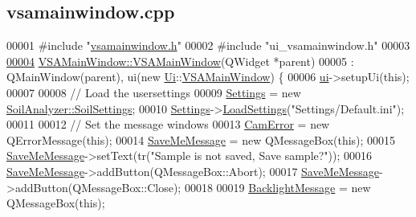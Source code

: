 \hypertarget{vsamainwindow_8cpp_source}{}\subsection{vsamainwindow.\+cpp}
\label{vsamainwindow_8cpp_source}

\begin{DoxyCode}
00001 \textcolor{preprocessor}{#include "\hyperlink{vsamainwindow_8h}{vsamainwindow.h}"}
00002 \textcolor{preprocessor}{#include "ui\_vsamainwindow.h"}
00003 
\hypertarget{vsamainwindow_8cpp_source_l00004}{}\hyperlink{class_v_s_a_main_window_a7fa18757c1fce5c8f41f25277f9e1a70}{00004} \hyperlink{class_v_s_a_main_window_a7fa18757c1fce5c8f41f25277f9e1a70}{VSAMainWindow::VSAMainWindow}(QWidget *parent)
00005     : QMainWindow(parent), ui(new \hyperlink{namespace_ui}{Ui}::\hyperlink{class_v_s_a_main_window}{VSAMainWindow}) \{
00006   \hyperlink{class_v_s_a_main_window_a958a0581d2bf1bfe020c3b5d8f738640}{ui}->setupUi(\textcolor{keyword}{this});
00007 
00008   \textcolor{comment}{// Load the usersettings}
00009   \hyperlink{class_v_s_a_main_window_a429310b9a60f66c4283dc609f869b48d}{Settings} = \textcolor{keyword}{new} \hyperlink{class_soil_analyzer_1_1_soil_settings}{SoilAnalyzer::SoilSettings};
00010   \hyperlink{class_v_s_a_main_window_a429310b9a60f66c4283dc609f869b48d}{Settings}->\hyperlink{class_soil_analyzer_1_1_soil_settings_a438bf660eeb7a49a676eef5da129f8d5}{LoadSettings}(\textcolor{stringliteral}{"Settings/Default.ini"});
00011 
00012   \textcolor{comment}{// Set the message windows}
00013   \hyperlink{class_v_s_a_main_window_ae59279edd83472b7096db4b119ceb45b}{CamError} = \textcolor{keyword}{new} QErrorMessage(\textcolor{keyword}{this});
00014   \hyperlink{class_v_s_a_main_window_a9d76854fefeb5abf8f2fd6089987a31c}{SaveMeMessage} = \textcolor{keyword}{new} QMessageBox(\textcolor{keyword}{this});
00015   \hyperlink{class_v_s_a_main_window_a9d76854fefeb5abf8f2fd6089987a31c}{SaveMeMessage}->setText(tr(\textcolor{stringliteral}{"Sample is not saved, Save sample?"}));
00016   \hyperlink{class_v_s_a_main_window_a9d76854fefeb5abf8f2fd6089987a31c}{SaveMeMessage}->addButton(QMessageBox::Abort);
00017   \hyperlink{class_v_s_a_main_window_a9d76854fefeb5abf8f2fd6089987a31c}{SaveMeMessage}->addButton(QMessageBox::Close);
00018 
00019   \hyperlink{class_v_s_a_main_window_a2202203116e6126f9361de629986b7b4}{BacklightMessage} = \textcolor{keyword}{new} QMessageBox(\textcolor{keyword}{this});

\end{DoxyCode}
